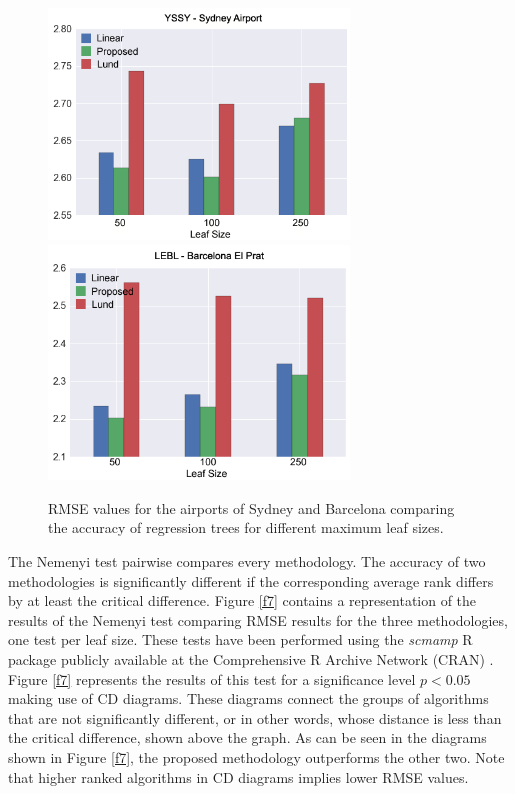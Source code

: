 \documentclass[times,twocolumn,final,authoryear]{elsarticle}
\begin{document}
\begin{figure}
  \includegraphics[width=8cm]{sydney.png}
  \includegraphics[width=8cm]{barcelona.png}
\caption{RMSE values for the airports of Sydney and Barcelona comparing the accuracy of regression trees for different maximum leaf sizes.}
\label{f6}
\end{figure}

The Nemenyi test pairwise compares every methodology. The accuracy of two methodologies is significantly different if the corresponding average rank differs by at least the critical difference. Figure \ref{f7} contains a representation of the results of the Nemenyi test comparing RMSE results for the three methodologies, one test per leaf size. These tests have been performed using the \textit{scmamp} R package publicly available at the Comprehensive R Archive Network (CRAN) \citep{Calvo2015}. Figure \ref{f7} represents the results of this test for a significance level $ p < 0.05 $ making use of CD diagrams.  These diagrams connect the groups of algorithms that are not significantly different, or in other words, whose distance is less than the critical difference, shown above the graph. As can be seen in the diagrams shown in Figure \ref{f7}, the proposed methodology outperforms the other two. Note that higher ranked algorithms in CD diagrams implies lower RMSE values.
\end{document}
